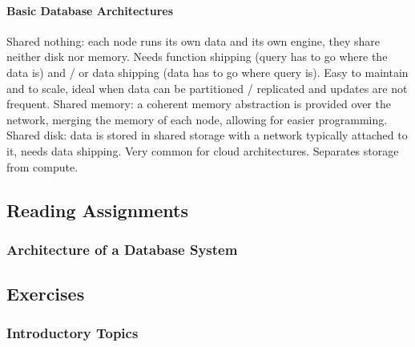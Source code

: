 \paragraph{Basic Database Architectures}
Shared nothing: each node runs its own data and its own engine, they share neither disk nor memory. Needs function shipping (query has to go where the data is) and / or data shipping (data has to go where query is). Easy to maintain and to scale, ideal when data can be partitioned / replicated and updates are not frequent. Shared memory: a coherent memory abstraction is provided over the network, merging the memory of each node, allowing for easier programming. Shared disk: data is stored in shared storage with a network typically attached to it, needs data shipping. Very common for cloud architectures. Separates storage from compute.

\subsection{Reading Assignments}

\subsubsection{Architecture of a Database System}

\subsection{Exercises}

\subsubsection{Introductory Topics}